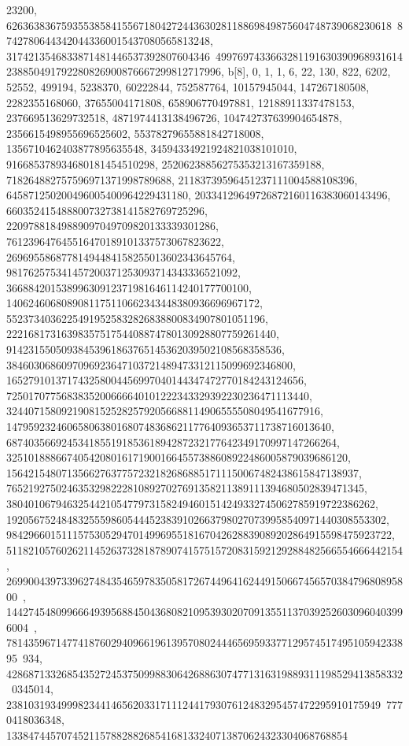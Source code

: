 {{{23200, 6263638367593553858415567180427244363028118869849875604748739068230618\
87427806443420443360015437080565813248, 3174213546833871481446537392807604346\
4997697433663281191630390968931614238850491792280826900876667299812717996}}, 
 {b[8], {0, 1, 1, 6, 22, 130, 822, 6202, 52552, 499194, 5238370, 60222844, 
   752587764, 10157945044, 147267180508, 2282355168060, 37655004171808, 
   658906770497881, 12188911337478153, 237669513629732518, 
   4871974413138496726, 104742737639904654878, 2356615498955696525602, 
   55378279655881842718008, 1356710462403877895635548, 
   34594334921924821038101010, 916685378934680181454510298, 
   25206238856275353213167359188, 718264882757596971371998789688, 
   21183739596451237111004588108396, 645871250200496005400964229431180, 
   20334129649726872160116383060143496, 660352415488800732738141582769725296, 
   22097881849889097049709820133339301286, 
   761239647645516470189101337573067823622, 
   26969558687781494484158255013602343645764, 
   981762575341457200371253093714343336521092, 
   36688420153899630912371981646114240177700100, 
   1406246068089081175110662343448380936696967172, 
   55237340362254919525832826838800834907801051196, 
   2221681731639835751754408874780130928807759261440, 
   91423155050938453961863765145362039502108568358536, 
   3846030686097096923647103721489473312115099692346800, 
   165279101371743258004456997040144347472770184243124656, 
   7250170775683835200666640101222343329392230236471113440, 
   324407158092190815252825792056688114906555508049541677916, 
   14795923246065806380168074836862117764093653711738716013640, 
   687403566924534185519185361894287232177642349170997147266264, 
   32510188866740542080161719001664557388608922486005879039686120, 
   1564215480713566276377572321826868851711150067482438615847138937, 
   76521927502463532982228108927027691358211389111394680502839471345, 
   3804010679463254421054779731582494601514249332745062785919722386262, 
   192056752484832555986054445238391026637980270739958540971440308553302, 
   9842966015111575305294701499695518167042628839089202864915598475923722, 
   511821057602621145263732818789074157515720831592129288482566554666442154, 
   26990043973396274843546597835058172674496416244915066745657038479680895800\
, 
   1442745480996664939568845043680821095393020709135511370392526030960403996004\
, 
   78143596714774187602940966196139570802444656959337712957451749510594233895\
934, 428687133268543527245375099883064268863074771316319889311198529413858332\
0345014, 23810319349998234414656203317111244179307612483295457472295910175949\
7770418036348, 13384744570745211578828826854168133240713870624323304068768854\
}}}
